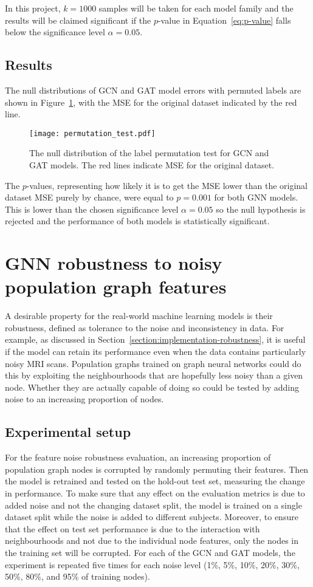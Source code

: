 In this project, $k=1000$ samples will be taken for each model family and the results will be claimed significant if the $p$-value in Equation~\eqref{eq:p-value} falls below the significance level $\alpha=0.05$. 

\subsection{Results}
The null distributions of GCN and GAT model errors with permuted labels are shown in Figure~\ref{figure:permutation-test}, with the MSE for the original dataset indicated by the red line.

\begin{figure}[h]
    \centering
    \texttt{[image: permutation\_test.pdf]}
    \caption{The null distribution of the label permutation test for GCN and GAT models. The red lines indicate MSE for the original dataset.}\label{figure:permutation-test}
\end{figure}

The $p$-values, representing how likely it is to get the MSE lower than the original dataset MSE purely by chance, were equal to $p=0.001$ for both GNN models. This is lower than the chosen significance level $\alpha=0.05$ so the null hypothesis is rejected and the performance of both models is statistically significant.


\section{GNN robustness to noisy population graph features}
\label{section:node-noise}
A desirable property for the real-world machine learning models is their robustness, defined as tolerance to the noise and inconsistency in data.
For example, as discussed in Section~\ref{section:implementation-robustness}, it is useful if the model can retain its performance even when the data contains particularly noisy MRI scans. Population graphs trained on graph neural networks could do this by exploiting the neighbourhoods that are hopefully less noisy than a given node. Whether they are actually capable of doing so could be tested by adding noise to an increasing proportion of nodes. 

\subsection{Experimental setup}
For the feature noise robustness evaluation, an increasing proportion of population graph nodes is corrupted by randomly permuting their features. Then the model is retrained and tested on the hold-out test set, measuring the change in performance. To make sure that any effect on the evaluation metrics is due to added noise and not the changing dataset split, the model is trained on a single dataset split while the noise is added to different subjects. Moreover, to ensure that the effect on test set performance is due to the interaction with neighbourhoods and not due to the individual node features, only the nodes in the training set will be corrupted. For each of the GCN and GAT models, the experiment is repeated five times for each noise level (1\%, 5\%, 10\%, 20\%, 30\%, 50\%, 80\%, and 95\% of training nodes).

